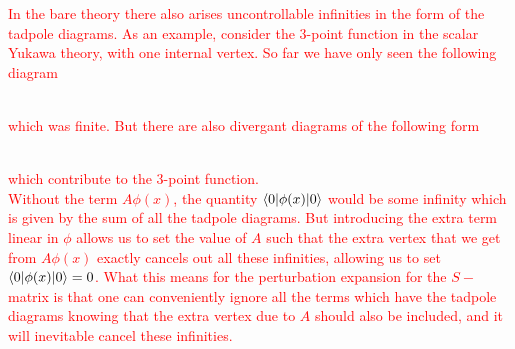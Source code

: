 \documentclass[11pt, notitlepage]{report}
\numberwithin{equation}{section}
\begin{document}
\textcolor{red}{
    In the bare theory there also arises uncontrollable infinities in the form of the tadpole diagrams. As an example, consider the 3-point function in the scalar Yukawa theory, with one internal vertex. So far we have only seen the following diagram 
    \begin{figure}[h]
        \centering
    \end{figure}\\
    which was finite. But there are also divergant diagrams of the following form
    \begin{figure}[h]
    \centering
\end{figure}\\
which contribute to the 3-point function.\\
Without the term \(A\phi(x)\), the quantity \(\braket{0|\phi(x)|0}\) would be some infinity which is given by the sum of all the tadpole diagrams. But introducing the extra term linear in \(\phi\) allows us to set the value of \(A\) such that the extra vertex that we get from \(A\phi(x)\) exactly cancels out all these infinities, allowing us to set \(\braket{0|\phi(x)|0} = 0\). What this means for the perturbation expansion for the \(S-\)matrix is that one can conveniently ignore all the terms which have the tadpole diagrams knowing that the extra vertex due to \(A\) should also be included, and it will inevitable cancel these infinities.\\
}
\end{document}
